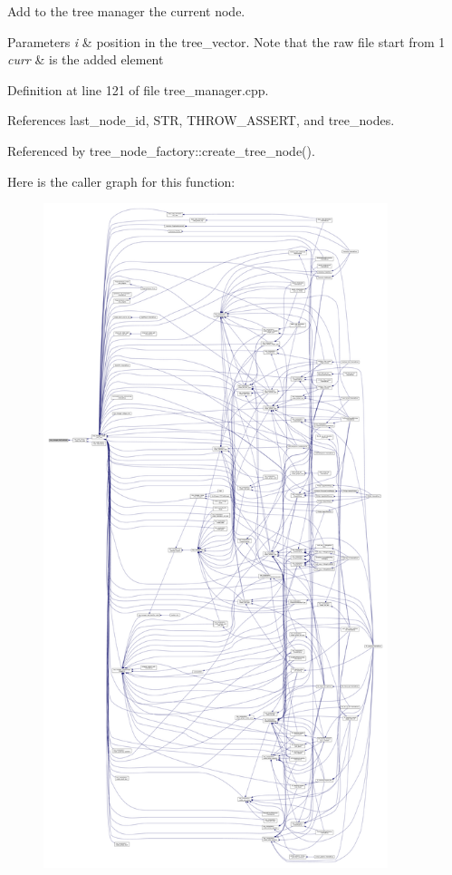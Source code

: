 Add to the tree manager the current node. 


\begin{DoxyParams}{Parameters}
{\em i} & position in the tree\+\_\+vector. Note that the raw file start from 1 \\
\hline
{\em curr} & is the added element \\
\hline
\end{DoxyParams}


Definition at line 121 of file tree\+\_\+manager.\+cpp.



References last\+\_\+node\+\_\+id, S\+TR, T\+H\+R\+O\+W\+\_\+\+A\+S\+S\+E\+RT, and tree\+\_\+nodes.



Referenced by tree\+\_\+node\+\_\+factory\+::create\+\_\+tree\+\_\+node().

Here is the caller graph for this function\+:
\nopagebreak
\begin{figure}[H]
\begin{center}
\leavevmode
\includegraphics[height=550pt]{d2/ddd/classtree__manager_ad41741bfa4e46fa272d0e321eb722893_icgraph}
\end{center}
\end{figure}
\mbox{\label{classtree__manager_a3be40fa69b053f44152021be01496bc0}} 
